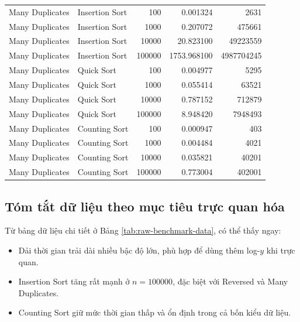 \begin{center}
\begin{longtable}{llrrr}
Many Duplicates & Insertion Sort & 100 & 0.001324 & 2631 \\
Many Duplicates & Insertion Sort & 1000 & 0.207072 & 475661 \\
Many Duplicates & Insertion Sort & 10000 & 20.823100 & 49223559 \\
Many Duplicates & Insertion Sort & 100000 & 1753.968100 & 4987704245 \\
Many Duplicates & Quick Sort & 100 & 0.004977 & 5295 \\
Many Duplicates & Quick Sort & 1000 & 0.055414 & 63521 \\
Many Duplicates & Quick Sort & 10000 & 0.787152 & 712879 \\
Many Duplicates & Quick Sort & 100000 & 8.948420 & 7948493 \\
Many Duplicates & Counting Sort & 100 & 0.000947 & 403 \\
Many Duplicates & Counting Sort & 1000 & 0.004484 & 4021 \\
Many Duplicates & Counting Sort & 10000 & 0.035821 & 40201 \\
Many Duplicates & Counting Sort & 100000 & 0.773004 & 402001 \\

\end{longtable}
\end{center}

\subsection{Tóm tắt dữ liệu theo mục tiêu trực quan hóa}

Từ bảng dữ liệu chi tiết ở Bảng \ref{tab:raw-benchmark-data}, có thể thấy ngay:
\begin{itemize}[leftmargin=1.2cm]
    \item Dải thời gian trải dài nhiều bậc độ lớn, phù hợp để dùng thêm log-$y$ khi trực quan.
    \item Insertion Sort tăng rất mạnh ở $n=100000$, đặc biệt với Reversed và Many Duplicates.
    \item Counting Sort giữ mức thời gian thấp và ổn định trong cả bốn kiểu dữ liệu.
\end{itemize}
